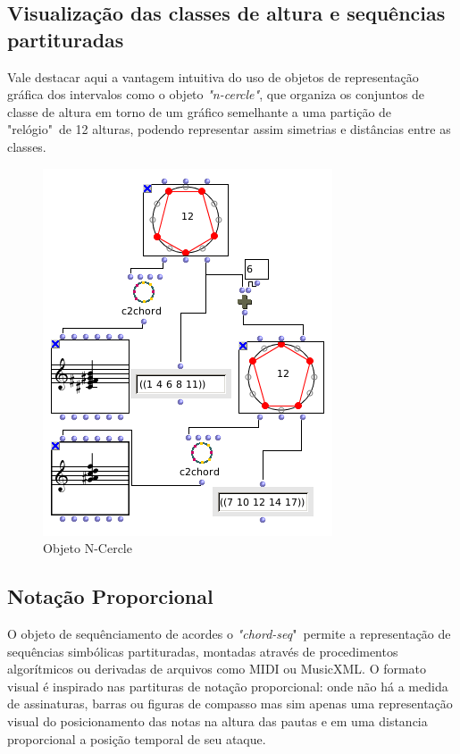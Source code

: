 \documentclass[
	12pt,				%
	openright,			%
	twoside,			%
	a4paper,			%
	english,			%
	french,				%
	spanish,			%
	brazil				%
	]{abntex2}
\begin{document}
\subsection{Visualização das classes de altura e sequências partituradas}

Vale destacar aqui a vantagem intuitiva do uso de objetos de representação gráfica dos intervalos como o objeto \textit{"n-cercle"}, que organiza os conjuntos de classe de altura em torno de um gráfico semelhante a uma partição de "relógio"\ de 12 alturas, podendo representar assim simetrias e distâncias entre as classes.

\begin{figure}[!h]
	\caption{\label{fig_grafico}Objeto N-Cercle }
	\begin{center}
	    \includegraphics[scale=0.5]{estudosM21/ncercle.png}
	\end{center}
\end{figure}

\subsection{Notação Proporcional}

O objeto de sequênciamento de acordes o \textit{"chord-seq}"\ permite a representação de sequências simbólicas partituradas, montadas através de procedimentos algorítmicos ou derivadas de arquivos como MIDI ou MusicXML. O formato visual é inspirado nas partituras de notação proporcional: onde não há a medida de assinaturas, barras ou figuras de compasso mas sim apenas uma representação visual do posicionamento das notas na altura das pautas e em uma distancia proporcional a posição temporal de seu ataque.
\end{document}
